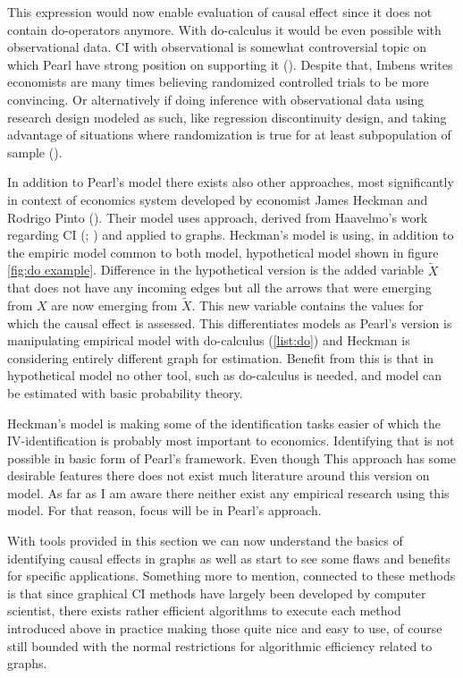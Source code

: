 \documentclass[main=english,12pt,a4paper,pdftex,econ,utf8]{aaltothesis}
\begin{document}
This expression would now enable evaluation of causal effect since it does not contain do-operators anymore. With do-calculus it would be even possible with observational data. CI with observational is somewhat controversial topic on which Pearl have strong position on supporting it (\cite{Pearl2018}). Despite that, Imbens writes economists are many times believing randomized controlled trials to be more convincing. Or alternatively if doing inference with observational data using research design modeled as such, like regression discontinuity design, and taking advantage of situations where randomization is true for at least subpopulation of sample (\cite{imbes2020}).


In addition to Pearl's model there exists also other approaches, most significantly in context of economics system developed by economist James Heckman and Rodrigo Pinto (\cite{Heckman2015}). Their model uses approach, derived from Haavelmo's work regarding CI (\cite{Haavelmo1943}; \cite{Haavelmo1944}) and applied to graphs. Heckman's model is using, in addition to the empiric model common to both model, hypothetical model shown in figure \ref{fig:do example}. Difference in the hypothetical version is the added variable $\tilde X$ that does not have any incoming edges but all the arrows that were emerging from $X$ are now emerging from $\tilde X$. This new variable contains the values for which the causal effect is assessed. This differentiates models as Pearl's version is manipulating empirical model with do-calculus (\ref{list:do}) and Heckman is considering entirely different graph for estimation. Benefit from this is that in hypothetical model no other tool, such as do-calculus is needed, and model can be estimated with basic probability theory.

Heckman's model is making some of the identification tasks easier of which the IV-identification is probably most important to economics. Identifying that is not possible in basic form of Pearl's framework. Even though This approach has some desirable features there does not exist much literature around this version on model. As far as I am aware there neither exist any empirical research using this model. For that reason, focus will be in Pearl's approach.

With tools provided in this section we can now understand the basics of identifying causal effects in graphs as well as start to see some flaws and benefits for specific applications. Something more to mention, connected to these methods is that since graphical CI methods have largely been developed by computer scientist, there exists rather efficient algorithms to execute each method introduced above in practice making those quite nice and easy to use, of course still bounded with the normal restrictions for algorithmic efficiency related to graphs.
\end{document}
